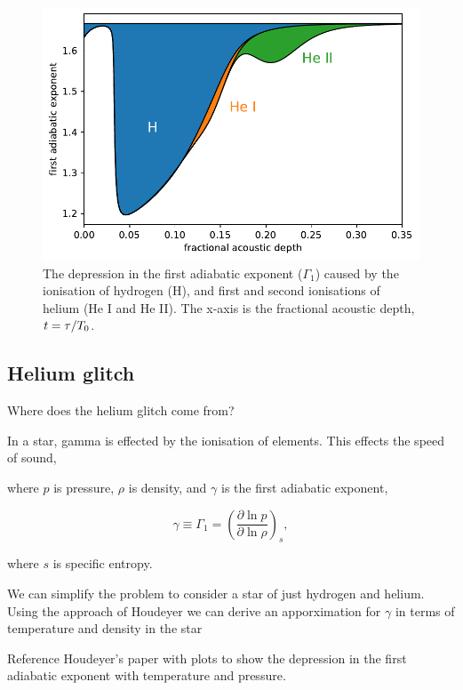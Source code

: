 \begin{figure}
    \centering
    \includegraphics{figures/adiabatic-ionisation-regions.pdf}
    \caption{The depression in the first adiabatic exponent (\(\Gamma_1\)) caused by the ionisation of hydrogen (H), and first and second ionisations of helium (He I and He II). The x-axis is the fractional acoustic depth, \(t=\tau/{T_0}\).}
\end{figure}


\subsection{Helium glitch}\label{sec:helium-glitch}

Where does the helium glitch come from?

In a star, gamma is effected by the ionisation of elements. This effects the speed of sound,

where \(p\) is pressure, \(\rho\) is density, and \(\gamma\) is the first adiabatic exponent,

\begin{equation}
    \gamma \equiv \Gamma_1 = \left( \frac{\partial \ln p}{\partial \ln \rho} \right)_s,
\end{equation}

where \(s\) is specific entropy.

We can simplify the problem to consider a star of just hydrogen and helium. Using the approach of Houdeyer we can derive an apporximation for \(\gamma\) in terms of temperature and density in the star

Reference Houdeyer's paper with plots to show the depression in the first adiabatic exponent with temperature and pressure. 

